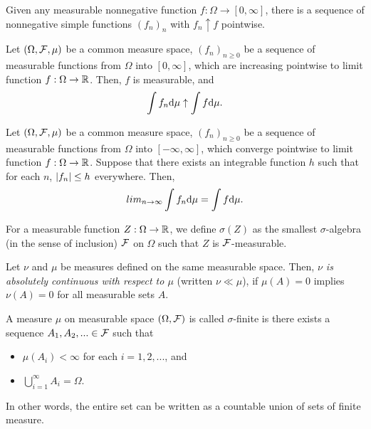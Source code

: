 \begin{prop}
    Given any measurable nonnegative function $f: \Omega \rightarrow [0, \infty]$, there is a sequence of nonnegative simple functions $(f_n)_n$ with $f_n \uparrow f$ pointwise.
\end{prop}
\begin{thm}
    Let $\left(\Omega, \mathcal{F}, \mu\right)$ be a common measure space, $(f_n)_{n \geq 0}$ be a sequence of measurable functions from $\Omega$ into $[0, \infty]$, which are increasing pointwise to limit function $f: \Omega \rightarrow \mathbb{R}$. Then, $f$ is measurable, and 
    \begin{align*}
        \int f_n \text{d} \mu \uparrow \int f \text{d} \mu.
    \end{align*}
\end{thm}
\begin{thm}
    Let $\left(\Omega, \mathcal{F}, \mu\right)$ be a common measure space, $(f_n)_{n \geq 0}$ be a sequence of measurable functions from $\Omega$ into $[-\infty, \infty]$, which converge pointwise to limit function $f: \Omega \rightarrow \mathbb{R}$. Suppose that there exists an integrable function $h$ such that for each $n$, $\left|f_n\right| \leq h$ everywhere. Then,
    \begin{align*}
        lim_{n \rightarrow \infty} \int f_n \text{d} \mu = \int f \text{d} \mu.
    \end{align*}
\end{thm}
\begin{defi}
    For a measurable function $Z: \Omega \rightarrow \mathbb{R}$, we define $\sigma(Z)$ as the smallest $\sigma$-algebra (in the sense of inclusion) $\mathcal{F}$ on $\Omega$ such that $Z$ is $\mathcal{F}$-measurable.
\end{defi}
\begin{defi}
    Let $\nu$ and $\mu$ be measures defined on the same measurable space. Then, {\it $\nu$ is absolutely continuous with respect to $\mu$} (written $\nu \ll \mu$), if $\mu(A) = 0$ implies $\nu(A) = 0$ for all measurable sets $A$.
\end{defi}
\begin{defi}
    A measure $\mu$ on measurable space $\left(\Omega, \mathcal{F}\right)$ is called $\sigma$-finite is there exists a sequence $A_1, A_2, ... \in \mathcal{F}$ such that 
    \begin{itemize}
        \item $\mu(A_i) < \infty$ for each $i = 1, 2, ...$, and 
        \item $\bigcup_{i=1}^\infty A_i = \Omega$.
    \end{itemize}
    In other words, the entire set can be written as a countable union of sets of finite measure.
\end{defi}
